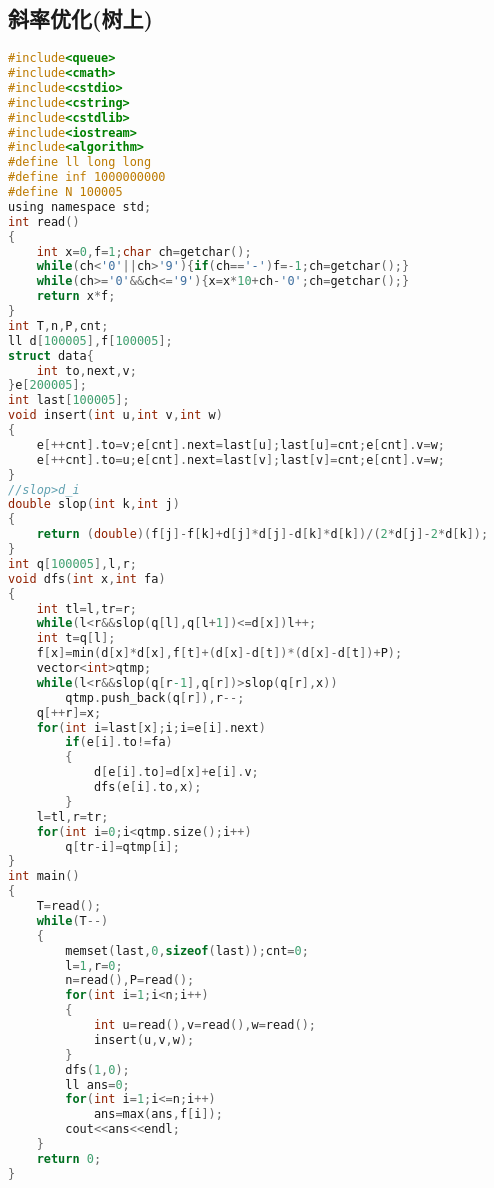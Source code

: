 \subsection{斜率优化(树上)}
\begin{lstlisting}[language=C] 
#include<queue>
#include<cmath>
#include<cstdio>
#include<cstring>
#include<cstdlib>
#include<iostream>
#include<algorithm>
#define ll long long
#define inf 1000000000
#define N 100005
using namespace std;
int read()
{
    int x=0,f=1;char ch=getchar();
    while(ch<'0'||ch>'9'){if(ch=='-')f=-1;ch=getchar();}
    while(ch>='0'&&ch<='9'){x=x*10+ch-'0';ch=getchar();}
    return x*f;
}
int T,n,P,cnt;
ll d[100005],f[100005];
struct data{
    int to,next,v;
}e[200005];
int last[100005];
void insert(int u,int v,int w)
{
    e[++cnt].to=v;e[cnt].next=last[u];last[u]=cnt;e[cnt].v=w;
    e[++cnt].to=u;e[cnt].next=last[v];last[v]=cnt;e[cnt].v=w;
}
//slop>d_i
double slop(int k,int j)
{
    return (double)(f[j]-f[k]+d[j]*d[j]-d[k]*d[k])/(2*d[j]-2*d[k]);
}
int q[100005],l,r;
void dfs(int x,int fa)
{
    int tl=l,tr=r;
    while(l<r&&slop(q[l],q[l+1])<=d[x])l++;
    int t=q[l];
    f[x]=min(d[x]*d[x],f[t]+(d[x]-d[t])*(d[x]-d[t])+P);
    vector<int>qtmp;
    while(l<r&&slop(q[r-1],q[r])>slop(q[r],x))
        qtmp.push_back(q[r]),r--;
    q[++r]=x;
    for(int i=last[x];i;i=e[i].next)
        if(e[i].to!=fa)
        {
            d[e[i].to]=d[x]+e[i].v;
            dfs(e[i].to,x);
        }
    l=tl,r=tr;
    for(int i=0;i<qtmp.size();i++)
        q[tr-i]=qtmp[i];
}
int main()
{
    T=read();
    while(T--)
    {
        memset(last,0,sizeof(last));cnt=0;
        l=1,r=0;
        n=read(),P=read();
        for(int i=1;i<n;i++)
        {
            int u=read(),v=read(),w=read();
            insert(u,v,w);
        }
        dfs(1,0);
        ll ans=0;
        for(int i=1;i<=n;i++)
            ans=max(ans,f[i]);
        cout<<ans<<endl;
    }
    return 0;
}
\end{lstlisting} 
